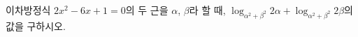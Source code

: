 이차방정식 $2x^2-6x+1=0$의 두 근을 $\alpha$, $\beta$라 할 때, $\log_{\alpha^2+\beta^2} 2\alpha+\log_{\alpha^2+\beta^2} 2\beta$의 값을 구하시오.
